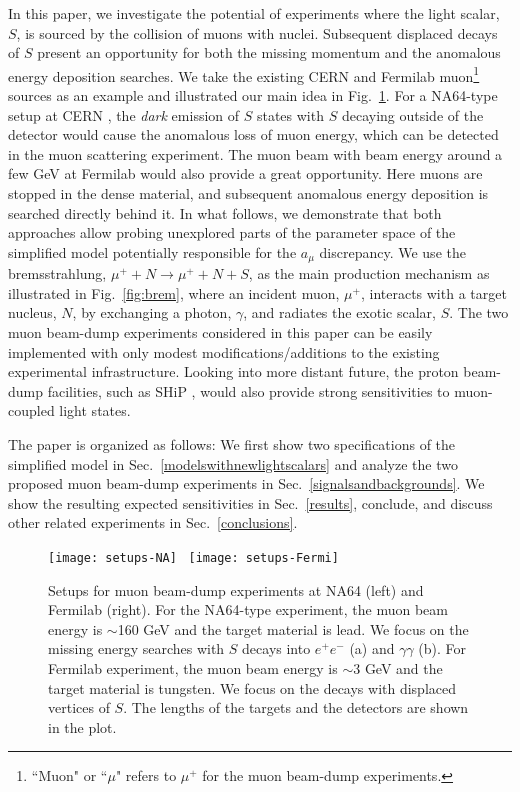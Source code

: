 \documentclass[prd,onecolumn,notitlepage,
nofootinbib,aps,tightenlines,
preprintnumbers,amsmath,amssymb,amsfonts,showpacs,superscriptaddress]{revtex4-1}
\begin{document}
In this paper, we investigate the potential of experiments where the light scalar, $S$, is sourced by the collision of 
muons with nuclei. Subsequent displaced decays of $S$ present an opportunity for both the 
missing momentum and the anomalous energy deposition searches. We take the existing CERN and Fermilab muon\footnote{``Muon" or ``$\mu$" refers to $\mu^+$ for the muon beam-dump experiments.} sources as an example and illustrated our main idea in Fig.~\ref{fig:setup}. For a NA64-type setup at CERN \cite{Andreas:2013lya,Gninenko:2014pea},  the \emph{dark} emission of $S$ states with $S$ decaying outside of the detector would cause the anomalous loss 
of muon energy, which can be detected in the muon scattering experiment.
The  muon beam with beam energy around a few GeV  at Fermilab would also provide a great opportunity. Here muons are stopped in the dense material, and subsequent anomalous energy deposition is searched 
directly behind it. In what follows, we  demonstrate that
both approaches  allow probing unexplored parts of the parameter space of the simplified model 
potentially responsible for the $a_\mu$ discrepancy. We use the bremsstrahlung, $\mu^+ + N \to \mu^+ + N + S$, as the main production mechanism as illustrated in Fig.~\ref{fig:brem}, where an incident muon, $\mu^+$, interacts with a target nucleus, $N$, by exchanging a photon, $\gamma$, and radiates the exotic scalar, $S$. The two muon beam-dump experiments considered in this paper can be easily implemented with only modest modifications/additions to the existing experimental infrastructure. Looking into more distant future, the proton beam-dump facilities, such as SHiP \cite{Alekhin:2015byh}, would also provide strong sensitivities to muon-coupled light states.



The paper is organized as follows:  We first show two specifications of the simplified model in Sec.~\ref{modelswithnewlightscalars} and analyze the two proposed muon beam-dump experiments in Sec.~\ref{signalsandbackgrounds}. We  show the resulting expected sensitivities in Sec.~\ref{results}, conclude, and discuss other related experiments in Sec.~\ref{conclusions}. 


\begin{figure}[t]
\centering
\texttt{[image: setups-NA]}\hspace*{1em}~
\texttt{[image: setups-Fermi]}\hspace*{2em}
\caption{\label{fig:setup}Setups for muon beam-dump experiments at NA64 (left) and  Fermilab (right).  For the NA64-type experiment, the muon beam energy is $\sim$160 GeV and the target material is lead. We focus on the missing energy searches with $S$ decays into $e^+ e^-$ (a) and $\gamma\gamma$ (b). For Fermilab experiment, the muon beam energy is $\sim$3 GeV and the target material is tungsten. We focus on the decays with displaced vertices of $S$. The lengths of the targets and the detectors are shown in the plot.}
\end{figure}
\end{document}
